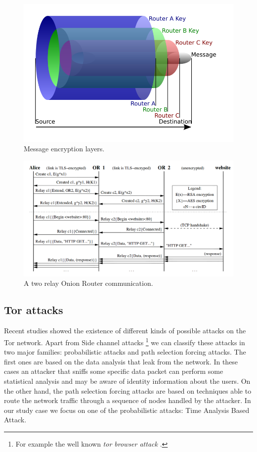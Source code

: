 \begin{figure}[H]
    \centering
    \includegraphics[scale=0.35]{onion.png}
    \caption{Message encryption layers.}
    \label{fig:onion}
\end{figure}

\begin{figure}
	\centering
	\includegraphics[scale=0.35]{or-communication.png}
	\caption{A two relay Onion Router communication.\cite{dingledine2004tor}}
\end{figure}


\subsection{Tor attacks}
Recent studies showed the existence of different kinds
of possible attacks on the Tor network\cite{salo2010recent}. 
Apart from Side channel attacks \footnote{For example the well known \emph{tor browser attack }.
}
we can classify these attacks in
two major families: probabilistic attacks and path selection forcing attacks.
The first ones are based on the data analysis that leak from the network. 
In these cases an attacker that sniffs some specific data packet can perform some 
statistical analysis and may be aware of identity information about the
users.
On the other hand, the path selection forcing attacks are based on techniques 
able to route the network traffic through a sequence of nodes handled by the attacker.
In our study case we focus on one of the probabilistic attacks: Time
Analysis Based Attack.
 
